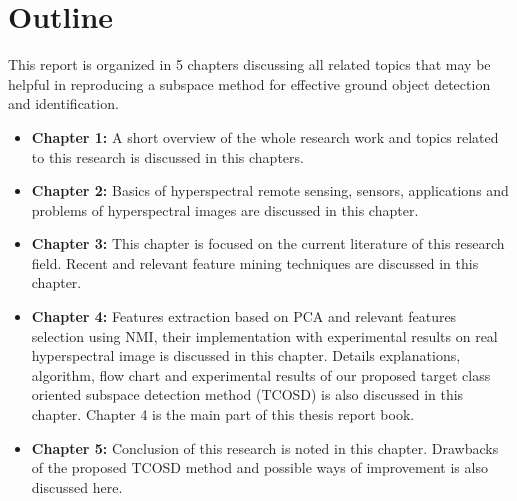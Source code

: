 \documentclass[document.tex]{subfiles}
\begin{document}
\section{Outline}
\noindent This report is organized in 5 chapters discussing all related topics that may be helpful in reproducing a subspace method for effective ground object detection and identification.
\begin{itemize}	
\item \textbf{Chapter 1: } A short overview of the whole research work and topics related to this research is discussed in this chapters.
\item \textbf{Chapter 2: } Basics of hyperspectral remote sensing, sensors, applications and problems of hyperspectral images are discussed in this chapter. 
\item \textbf{Chapter 3: } This chapter is focused on the current literature of this research field. Recent and relevant feature mining techniques are discussed in this chapter.
\item \textbf{Chapter 4: } Features extraction based on PCA and relevant features selection using NMI, their implementation with experimental results on real hyperspectral image is discussed in this chapter. Details explanations, algorithm, flow chart and experimental results of our proposed target class oriented subspace detection method (TCOSD) is also discussed in this chapter. Chapter 4 is the main part of this thesis report book.
\item \textbf{Chapter 5: } Conclusion of this research is noted in this chapter. Drawbacks of the proposed TCOSD method and possible ways of improvement is also discussed here.
\end{itemize}
\end{document}
